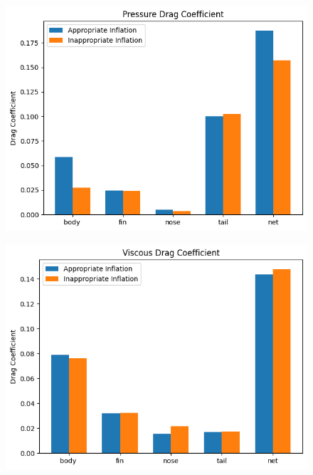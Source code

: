 \documentclass[uplatex,dvipdfmx,a4j,12pt]{jsarticle}
\begin{document}
\begin{figure}[H]
  \centering
  \begin{minipage}{0.45\linewidth}
      \centering
      \includegraphics[width=\linewidth]{wall_function/img/4_3_2_pressure_drag.png}
      \label{fig:4_3_2_cd_pressure}
  \end{minipage}
  \begin{minipage}{0.45\linewidth}
      \centering
      \includegraphics[width=\linewidth]{wall_function/img/4_3_2_viscous_drag.png}
      \label{fig:4_3_2_cd_viscous}
  \end{minipage}
  \begin{minipage}{0.45\linewidth}

\end{minipage}
\end{figure}
\end{document}
